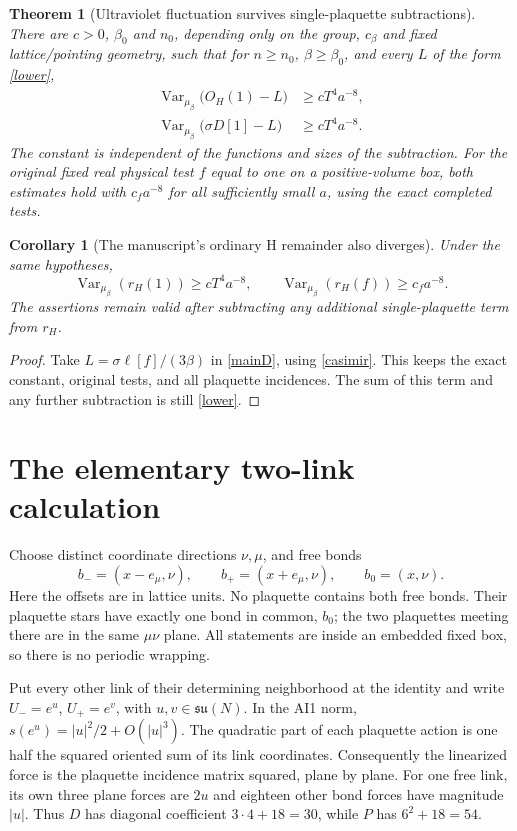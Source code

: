 \documentclass[11pt]{article}
\newtheorem{theorem}{Theorem}
\newtheorem{corollary}{Corollary}
\newcommand{\Var}{\operatorname{Var}}
\newcommand{\su}{\mathfrak{su}}
\begin{document}
\begin{theorem}[Ultraviolet fluctuation survives single-plaquette subtractions]
\label{main}
There are $c>0$, $\beta_0$ and $n_0$, depending only on the group,
$c_\beta$ and fixed lattice/pointing geometry, such that for $n\ge n_0$,
$\beta\ge\beta_0$, and every $L$ of the form \eqref{lower},
\begin{align}
 \Var_{\mu_\beta}\bigl(O_H(1)-L\bigr)&\ge cT^4a^{-8},\label{mainH}\\
 \Var_{\mu_\beta}\bigl(\sigma D[1]-L\bigr)&\ge cT^4a^{-8}.\label{mainD}
\end{align}
The constant is independent of the functions and sizes of the subtraction.
For the original fixed real physical test $f$ equal to one on a
positive-volume box, both estimates hold with $c_fa^{-8}$ for all sufficiently
small $a$, using the exact completed tests.
\end{theorem}

\begin{corollary}[The manuscript's ordinary H remainder also diverges]
Under the same hypotheses,
\[
 \Var_{\mu_\beta}(r_H(1))\ge cT^4a^{-8},\qquad
 \Var_{\mu_\beta}(r_H(f))\ge c_fa^{-8}.
\]
The assertions remain valid after subtracting any additional
single-plaquette term from $r_H$.
\end{corollary}
\begin{proof}
Take $L=\sigma\ell[f]/(3\beta)$ in \eqref{mainD}, using \eqref{casimir}.
This keeps the exact constant, original tests, and all plaquette incidences.
The sum of this term and any further subtraction is still \eqref{lower}.
\end{proof}

\section{The elementary two-link calculation}
Choose distinct coordinate directions $\nu,\mu$, and free bonds
\[
 b_-=(x-e_\mu,\nu),\qquad b_+=(x+e_\mu,\nu),
 \qquad b_0=(x,\nu).
\]
Here the offsets are in lattice units. No plaquette contains both free bonds.
Their plaquette stars have exactly one bond in common, $b_0$; the two
plaquettes meeting there are in the same $\mu\nu$ plane. All statements are
inside an embedded fixed box, so there is no periodic wrapping.

Put every other link of their determining neighborhood at the identity and
write $U_-=e^u$, $U_+=e^v$, with $u,v\in\su(N)$. In the AI1 norm,
$s(e^u)=|u|^2/2+O(|u|^3)$. The quadratic part of each plaquette action
is one half the squared oriented sum of its link coordinates. Consequently
the linearized force is the plaquette incidence matrix squared, plane by
plane. For one free link, its own three plane forces are $2u$ and eighteen
other bond forces have magnitude $|u|$. Thus $D$ has diagonal coefficient
$3\cdot4+18=30$, while $P$ has $6^2+18=54$.
\end{document}
